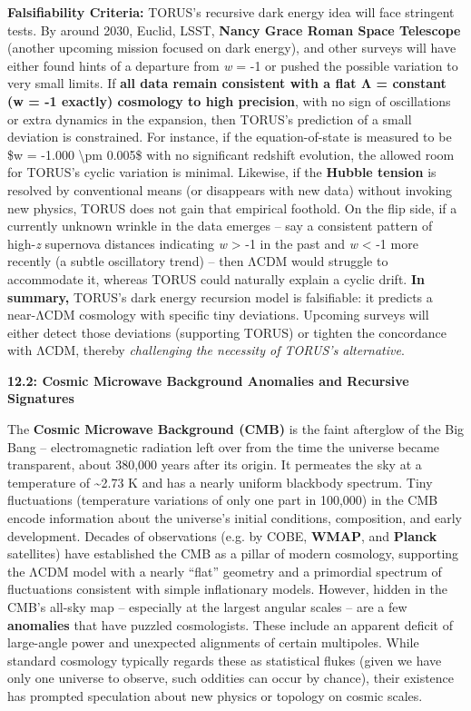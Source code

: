 \documentclass[
]{article}
\begin{document}
\textbf{Falsifiability Criteria:} TORUS's recursive dark energy idea
will face stringent tests. By around 2030, Euclid, LSST, \textbf{Nancy
Grace Roman Space Telescope} (another upcoming mission focused on dark
energy), and other surveys will have either found hints of a departure
from \emph{w} = -1 or pushed the possible variation to very small
limits. If \textbf{all data remain consistent with a flat Λ = constant
(w = -1 exactly) cosmology to high precision}, with no sign of
oscillations or extra dynamics in the expansion, then TORUS's prediction
of a small deviation is constrained. For instance, if the
equation-of-state is measured to be \$w = -1.000 \textbackslash pm
0.005\$ with no significant redshift evolution, the allowed room for
TORUS's cyclic variation is minimal. Likewise, if the \textbf{Hubble
tension} is resolved by conventional means (or disappears with new data)
without invoking new physics, TORUS does not gain that empirical
foothold. On the flip side, if a currently unknown wrinkle in the data
emerges -- say a consistent pattern of high-\emph{z} supernova distances
indicating \emph{w} \textgreater{} -1 in the past and \emph{w}
\textless{} -1 more recently (a subtle oscillatory trend) -- then ΛCDM
would struggle to accommodate it, whereas TORUS could naturally explain
a cyclic drift. \textbf{In summary,} TORUS's dark energy recursion model
is falsifiable: it predicts a near-ΛCDM cosmology with specific tiny
deviations. Upcoming surveys will either detect those deviations
(supporting TORUS) or tighten the concordance with ΛCDM, thereby
\emph{challenging the necessity of TORUS's alternative}\hspace{0pt}.

\textbf{12.2: Cosmic Microwave Background Anomalies and Recursive
Signatures}

The \textbf{Cosmic Microwave Background (CMB)} is the faint afterglow of
the Big Bang -- electromagnetic radiation left over from the time the
universe became transparent, about 380,000 years after its origin. It
permeates the sky at a temperature of \textasciitilde2.73 K and has a
nearly uniform blackbody spectrum. Tiny fluctuations (temperature
variations of only one part in 100,000) in the CMB encode information
about the universe's initial conditions, composition, and early
development. Decades of observations (e.g. by COBE, \textbf{WMAP}, and
\textbf{Planck} satellites) have established the CMB as a pillar of
modern cosmology, supporting the ΛCDM model with a nearly ``flat''
geometry and a primordial spectrum of fluctuations consistent with
simple inflationary models. However, hidden in the CMB's all-sky map --
especially at the largest angular scales -- are a few \textbf{anomalies}
that have puzzled cosmologists. These include an apparent deficit of
large-angle power and unexpected alignments of certain multipoles. While
standard cosmology typically regards these as statistical flukes (given
we have only one universe to observe, such oddities can occur by
chance), their existence has prompted speculation about new physics or
topology on cosmic scales.
\end{document}
